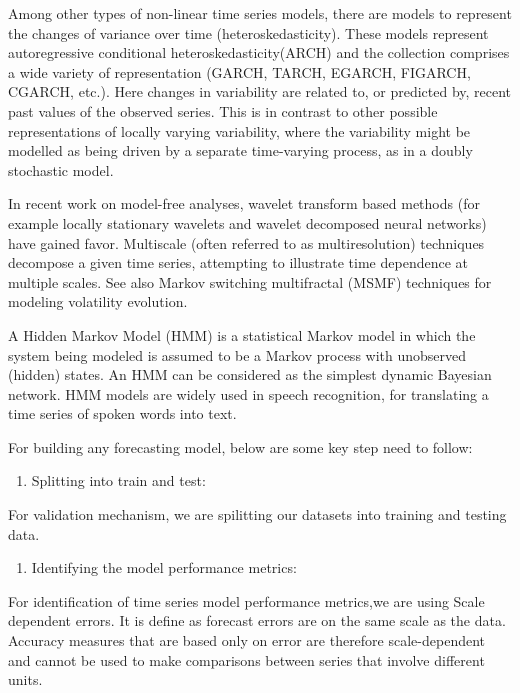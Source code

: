 \documentclass[12pt,openany]{book}
\providecommand{\tightlist}{%
  \setlength{\itemsep}{0pt}\setlength{\parskip}{0pt}}
\begin{document}
Among other types of non-linear time series models, there are models to represent the changes of variance over time (heteroskedasticity). These models represent autoregressive conditional heteroskedasticity(ARCH) and the collection comprises a wide variety of representation (GARCH, TARCH, EGARCH, FIGARCH, CGARCH, etc.). Here changes in variability are related to, or predicted by, recent past values of the observed series. This is in contrast to other possible representations of locally varying variability, where the variability might be modelled as being driven by a separate time-varying process, as in a doubly stochastic model.

In recent work on model-free analyses, wavelet transform based methods (for example locally stationary wavelets and wavelet decomposed neural networks) have gained favor. Multiscale (often referred to as multiresolution) techniques decompose a given time series, attempting to illustrate time dependence at multiple scales. See also Markov switching multifractal (MSMF) techniques for modeling volatility evolution.

A Hidden Markov Model (HMM) is a statistical Markov model in which the system being modeled is assumed to be a Markov process with unobserved (hidden) states. An HMM can be considered as the simplest dynamic Bayesian network. HMM models are widely used in speech recognition, for translating a time series of spoken words into text.

For building any forecasting model, below are some key step need to follow:

\begin{enumerate}
\def\labelenumi{\arabic{enumi}.}
\tightlist
\item
  Splitting into train and test:
\end{enumerate}

For validation mechanism, we are spilitting our datasets into training and testing data.

\begin{enumerate}
\def\labelenumi{\arabic{enumi}.}
\setcounter{enumi}{1}
\tightlist
\item
  Identifying the model performance metrics:
\end{enumerate}

For identification of time series model performance metrics,we are using Scale dependent errors. It is define as forecast errors are on the same scale as the data. Accuracy measures that are based only on error are therefore scale-dependent and cannot be used to make comparisons between series that involve different units.
\end{document}
